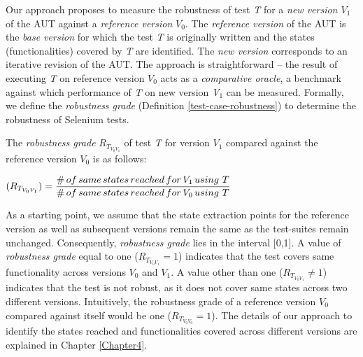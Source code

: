 Our approach proposes to measure the robustness of test \textit{T} for a \textit{new version $V_{1}$} of the AUT against a \textit{reference version} \textit{$V_{0}$}. The \textit{reference version} of the AUT is the \textit{base version} for which the test \textit{T} is originally written and the states (functionalities) covered by \textit{T} are identified. The \textit{new version} corresponds to an iterative revision of the AUT. The approach is straightforward -- the result of executing \textit{T} on reference version \textit{$V_{0}$} acts as a \textit{comparative oracle}, a benchmark against which performance of \textit{T} on new version \textit{V$_{1}$} can be measured. Formally, we define the \textit{
robustness grade} (Definition \ref{test-case-robustness}) to determine the robustness of Selenium tests. 

\theoremstyle{definition}

\begin{definition}{The \textit{robustness grade} $R_{T_{V_{0}V_{1}}}$ of test \textit{T} for version \textit{$V_{1}$} compared against the reference version \textit{$V_{0}$} is as follows:}
\begin{center}
\vspace{0.5cm}
$(R_{T_{V_{0}V_{1}}}) = \displaystyle \frac{\#\thinspace of \thinspace same \thinspace states \thinspace reached \thinspace for \thinspace V_{1} \thinspace using \thinspace \thinspace T}{\# \thinspace of \thinspace same \thinspace states \thinspace reached  \thinspace for \thinspace V_{0} \thinspace using \thinspace \thinspace T}$ \normalsize
\end{center}
\label{test-case-robustness} 
\end{definition} 

As a starting point, we assume that the state extraction points for the reference version as well as subsequent versions remain the same as the test-suites remain unchanged. Consequently, \textit{
robustness grade} lies in the interval [0,1]. A value of \textit{
robustness grade} equal to one ($R_{T_{V_{0}V_{1}}}=1$) indicates that the test covers same functionality across versions \textit{$V_{0}$} and \textit{$V_{1}$}. A value other than one ($R_{T_{V_{0}V_{1}}}\neq 1$) indicates that the test is not robust, as it does not cover same states across two different versions. Intuitively, the robustness grade of a reference version $V_{0}$ compared against itself would be one ($R_{T_{V_{0}V_{0}}}=1$). The details of our approach to identify the states reached and functionalities covered across different versions are explained in Chapter \ref{Chapter4}.

